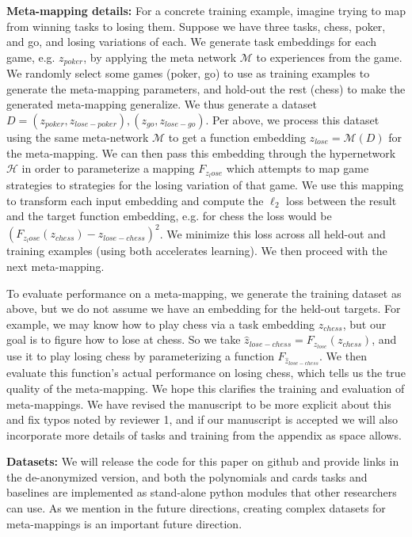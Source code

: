 \documentclass{article}
\begin{document}
\textbf{Meta-mapping details:} For a concrete training example, imagine trying to map from winning tasks to losing them. Suppose we have three tasks, chess, poker, and go, and losing variations of each. We generate task embeddings for each game, e.g. $z_{poker}$, by applying the meta network $\mathcal{M}$ to experiences from the game. We randomly select some games (poker, go) to use as training examples to generate the meta-mapping parameters, and hold-out the rest (chess) to make the generated meta-mapping generalize. We thus generate a dataset $D = {(z_{poker}, z_{lose-poker}), (z_{go}, z_{lose-go})}$. Per above, we process this dataset using the same meta-network $\mathcal{M}$ to get a function embedding $z_{lose} = \mathcal{M}(D)$ for the meta-mapping. We can then pass this embedding through the hypernetwork $\mathcal{H}$ in order to parameterize a mapping $F_{z_lose}$ which attempts to map game strategies to strategies for the losing variation of that game. We use this mapping to transform each input embedding and compute the $\ell_2$ loss between the result and the target function embedding, e.g. for chess the loss would be $(F_{z_lose}(z_{chess}) - z_{lose-chess})^2$. We minimize this loss across all held-out and training examples (using both accelerates learning). We then proceed with the next meta-mapping. \par
{}
To evaluate performance on a meta-mapping, we generate the training dataset as above, but we do not assume we have an embedding for the held-out targets. For example, we may know how to play chess via a task embedding $z_{chess}$, but our goal is to figure how to lose at chess. So we take $\hat{z}_{lose-chess} = F_{z_{lose}}(z_{chess})$, and use it to play losing chess by parameterizing a function $F_{\hat{z}_{lose-chess}}$. We then evaluate this function's actual performance on losing chess, which tells us the true quality of the meta-mapping. We hope this clarifies the training and evaluation of meta-mappings. We have revised the manuscript to be more explicit about this and fix typos noted by reviewer 1, and if our manuscript is accepted we will also incorporate more details of tasks and training from the appendix as space allows. \par
{}
\textbf{Datasets:} We will release the code for this paper on github and provide links in the de-anonymized version, and both the polynomials and cards tasks and baselines are implemented as stand-alone python modules that other researchers can use. As we mention in the future directions, creating complex datasets for meta-mappings is an important future direction. \par
\end{document}
